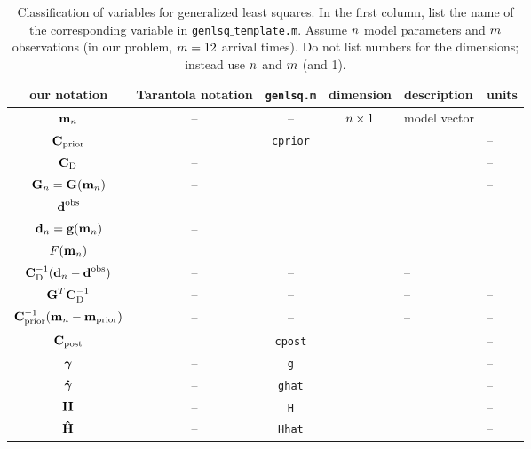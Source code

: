 \begin{table}[h]
\caption[]{{
Classification of variables for generalized least squares. In the first column, list the name of the corresponding variable in {\tt genlsq$\_$template.m}. Assume $n$ model parameters and $m$ observations (in our problem, $m=12$ arrival times). Do not list numbers for the dimensions; instead use $n$ and $m$ (and 1).
\label{tab:vars}
}}
\begin{spacing}{1.4}
\hspace{-1cm}
\begin{tabular}{c|c|c|c|l|l}
\hline
our notation & Tarantola notation & {\tt genlsq.m} & dimension & description \hspace{2cm} & units \hspace{0.5cm} \\
\hline\hline 
$\mbox{${\bf m}$}_n$
& --
& --
& $n \times 1$ 
& model vector
&
\\ \hline
$\mbox{${\bf C}$}_{\rm prior}$
& 
& \verb+cprior+
&
&
& --
\\ \hline
$\mbox{${\bf C}$}_{\rm D}$
& --
&
&
&
& --
\\ \hline
$\mbox{${\bf G}$}_n = \mbox{${\bf G}$}(\mbox{${\bf m}$}_n)$
& --
& 
&
&
& --
\\ \hline
$\mbox{${\bf d}$}^{\rm obs}$
&
&
&
& 
\\ \hline
$\mbox{${\bf d}$}_n = \mbox{${\bf g}$}(\mbox{${\bf m}$}_n)$
& --
&
&
& 
\\ \hline
\hline
$F(\mbox{${\bf m}$}_n)$
&
&
&
&
\\ \hline
$\mbox{${\bf C}$}_{\rm D}^{-1} (\mbox{${\bf d}$}_n - \mbox{${\bf d}$}^{\rm obs})$
& --
& --
&
& --
\\ \hline
$\mbox{${\bf G}$}^T\mbox{${\bf C}$}_{\rm D}^{-1}$
& --
& --
&
& --
& --
\\ \hline
$\mbox{${\bf C}$}_{\rm prior}^{-1} (\mbox{${\bf m}$}_n - \mbox{${\bf m}$}_{\rm prior})$
& --
& --
&
& --
& --
\\ \hline
\hline
$\mbox{${\bf C}$}_{\rm post}$
& 
& \verb+cpost+
&
& 
& --
\\ \hline
$\mbox{\boldmath $\bf \gamma$}$
& --
& \verb+g+
&
&
& --
\\ \hline
$\mbox{\boldmath{$\hat{\gamma}$}}$
& --
& \verb+ghat+
&
&
& --
\\ \hline
$\mbox{${\bf H}$}$
& --
& \verb+H+
&
&
& --
\\ \hline
$\mbox{\boldmath{$\hat{\rm H}$}}$
& --
& \verb+Hhat+
&
&
& --
\\ \hline
\hline
\end{tabular}
\end{spacing}
\end{table}
